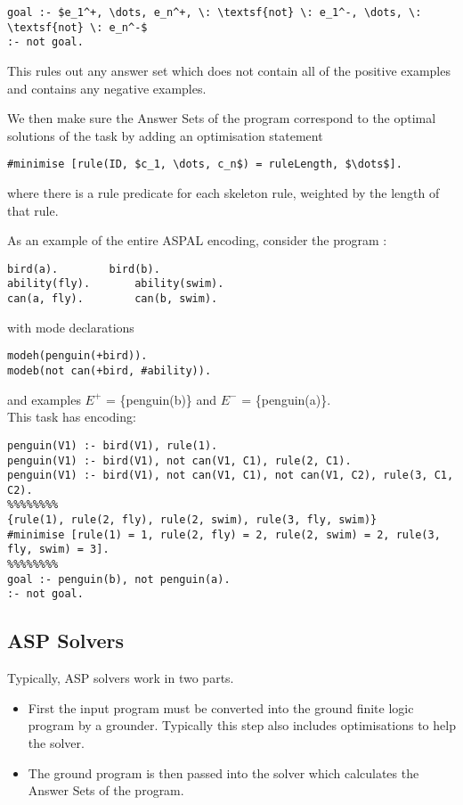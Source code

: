 \begin{lstlisting}[mathescape=true]
goal :- $e_1^+, \dots, e_n^+, \: \textsf{not} \: e_1^-, \dots, \: \textsf{not} \: e_n^-$
:- not goal.
\end{lstlisting}

This rules out any answer set which does not contain all of the positive examples and contains any negative examples.

We then make sure the Answer Sets of the program correspond to the optimal solutions of the task by adding an optimisation statement
\begin{lstlisting}[mathescape=true]
#minimise [rule(ID, $c_1, \dots, c_n$) = ruleLength, $\dots$].
\end{lstlisting}

where there is a rule predicate for each skeleton rule, weighted by the length of that rule.

As an example of the entire ASPAL encoding, consider the program :

\begin{lstlisting}
bird(a).		bird(b).
ability(fly).		ability(swim).
can(a, fly).		can(b, swim).
\end{lstlisting}

with mode declarations 

\begin{lstlisting}
modeh(penguin(+bird)).
modeb(not can(+bird, #ability)).
\end{lstlisting}

and examples $E^+$ = \{penguin(b)\} and $E^-$ = \{penguin(a)\}. \\
This task has encoding:

\begin{lstlisting}
penguin(V1) :- bird(V1), rule(1).
penguin(V1) :- bird(V1), not can(V1, C1), rule(2, C1).
penguin(V1) :- bird(V1), not can(V1, C1), not can(V1, C2), rule(3, C1, C2).
%%%%%%%%
{rule(1), rule(2, fly), rule(2, swim), rule(3, fly, swim)}
#minimise [rule(1) = 1, rule(2, fly) = 2, rule(2, swim) = 2, rule(3, fly, swim) = 3].
%%%%%%%%
goal :- penguin(b), not penguin(a).
:- not goal.
\end{lstlisting}

\subsection{ASP Solvers}

Typically, ASP solvers work in two parts.

\begin{itemize}
\item First the input program must be converted into the ground finite logic program by a grounder. Typically this step also includes optimisations to help the solver.
\item The ground program is then passed into the solver which calculates the Answer Sets of the program.
\end{itemize}

